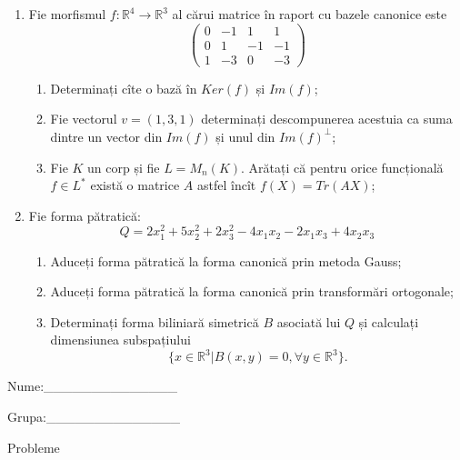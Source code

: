 \documentclass{article}
\begin{document}
\begin{enumerate}
 \item Fie morfismul $f:\mathbb{R}^4 \to \mathbb{R}^3$ al cărui matrice în raport cu bazele canonice este
$$\begin{pmatrix}
0&-1&1&1\\
0&1&-1&-1\\
1&-3&0&-3
\end{pmatrix}$$

\begin{enumerate}
\item Determinați cîte o bază în $Ker(f)$ și $Im(f)$;
\item Fie vectorul $v=(1,3,1)$ determinați descompunerea acestuia ca suma dintre un vector din $Im(f)$ și unul din $Im(f)^\perp$;
\item Fie $K$ un corp și fie $L=M_n(K)$. Arătați că pentru orice funcțională $f \in L^*$ există o matrice $A$ astfel încît $f(X)=Tr(AX)$;
\end{enumerate}
\item Fie forma pătratică:
$$Q= 2x_1^2+5x_2^2+2x_3^2-4x_1x_2-2x_1x_3+4x_2x_3$$

\begin{enumerate}
\item Aduceți forma pătratică la forma canonică prin metoda Gauss;
\item Aduceți forma pătratică la forma canonică prin transformări ortogonale;
\item Determinați forma biliniară simetrică $B$ asociată lui $Q$ și calculați dimensiunea subspațiului
$$\{x \in \mathbb{R}^3 | B(x,y)=0,\forall y \in \mathbb{R}^3\}.$$

\end{enumerate}
\end{enumerate}
\newpage
\begin{flushright}
Nume:\_\_\_\_\_\_\_\_\_\_\_\_\_\_
 
 
Grupa:\_\_\_\_\_\_\_\_\_\_\_\_\_\_
\end{flushright}
\begin{center}
\vspace{2cm}
{\Large Probleme}
\vspace{2cm}
\end{center}
\end{document}
